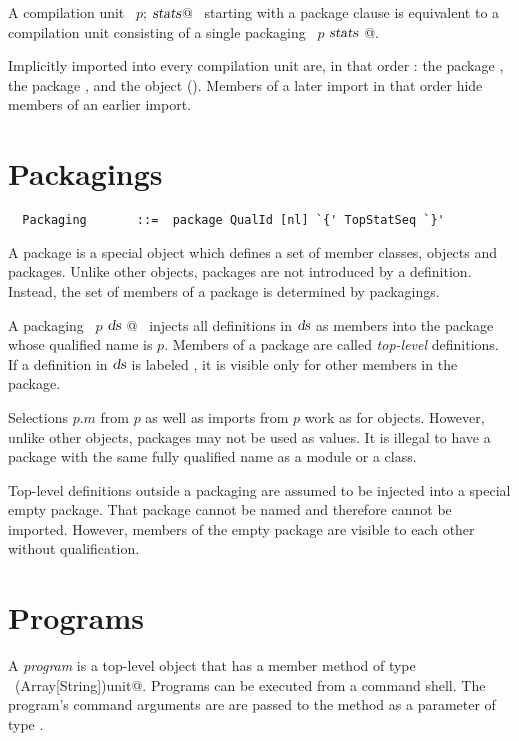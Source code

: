A compilation unit ~\lstinline@package $p$; $\mbox{\sl stats}$@~ starting with a package
clause is equivalent to a compilation unit consisting of a single
packaging ~\lstinline@package $p$ { $\mbox{\sl stats}$ }@.

Implicitly imported into every compilation unit are, in that order :
the package , the package , and the object
 (). Members of a later import in
that order hide members of an earlier import.

\section{Packagings}\label{sec:packagings}

\syntax\begin{lstlisting}
  Packaging       ::=  package QualId [nl] `{' TopStatSeq `}'
\end{lstlisting}

A package is a special object which defines a set of member classes,
objects and packages.  Unlike other objects, packages are not introduced
by a definition.  Instead, the set of members of a package is determined by
packagings.

A packaging ~\lstinline@package $p$ { $\mbox{\sl ds}$ }@~ injects all
definitions in $\mbox{\sl ds}$ as members into the package whose qualified name
is $p$. Members of a package are called {\em top-level} definitions.
If a definition in $\mbox{\sl ds}$ is labeled , it is
visible only for other members in the package.

Selections $p$.$m$ from $p$ as well as imports from $p$
work as for objects. However, unlike other objects, packages may not
be used as values. It is illegal to have a package with the same fully
qualified name as a module or a class.

Top-level definitions outside a packaging are assumed to be injected
into a special empty package. That package cannot be named and
therefore cannot be imported. However, members of the empty package
are visible to each other without qualification.

\section{Programs}

A {\em program} is a top-level object that has a member method
 of type ~\lstinline@(Array[String])unit@. Programs can be
executed from a command shell. The program's command arguments are are
passed to the  method as a parameter of type
.

